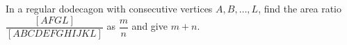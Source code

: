 In a regular dodecagon with consecutive vertices $A,B,\ldots,L$, find the area ratio $\dfrac{[AFGL]}{[ABCDEFGHIJKL]}$ as $\dfrac{m}{n}$ and give $m+n$.
